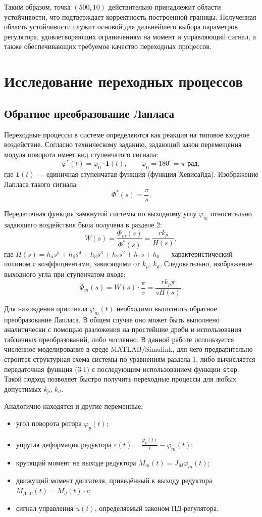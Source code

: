 \documentclass[a4paper, 14pt]{extarticle}
\begin{document}
    Таким образом, точка $(500,10)$ действительно принадлежит области устойчивости, что подтверждает корректность построенной границы. Полученная область устойчивости служит основой для дальнейшего выбора параметров регулятора, удовлетворяющих ограничениям на момент и управляющий сигнал, а также обеспечивающих требуемое качество переходных процессов.

    \newpage
    \section{Исследование переходных процессов}

    \subsection{Обратное преобразование Лапласа}
    Переходные процессы в системе определяются как реакция на типовое входное воздействие. Согласно техническому заданию, задающий закон перемещения модуля поворота имеет вид ступенчатого сигнала:
    \[
    \varphi^*(t) = \varphi_0 \cdot \mathbf{1}(t), \qquad \varphi_0 = 180^\circ = \pi \text{ рад},
    \]
    где $\mathbf{1}(t)$ — единичная ступенчатая функция (функция Хевисайда). Изображение Лапласа такого сигнала:
    \[
    \Phi^*(s) = \frac{\pi}{s}.
    \]

    Передаточная функция замкнутой системы по выходному углу $\varphi_m$ относительно задающего воздействия была получена в разделе 2:
    \[
    W(s) = \frac{\Phi_m(s)}{\Phi^*(s)} = \frac{r k_p}{H(s)},
    \]
    где $H(s) = h_5 s^5 + h_4 s^4 + h_3 s^3 + h_2 s^2 + h_1 s + h_0$ — характеристический полином с коэффициентами, зависящими от $k_p$, $k_d$. Следовательно, изображение выходного угла при ступенчатом входе:
    \[
    \Phi_m(s) = W(s) \cdot \frac{\pi}{s} = \frac{r k_p \pi}{s H(s)}. \tag{3.1}
    \]

    Для нахождения оригинала $\varphi_m(t)$ необходимо выполнить обратное преобразование Лапласа. В общем случае оно может быть выполнено аналитически с помощью разложения на простейшие дроби и использования табличных преобразований, либо численно. В данной работе используется численное моделирование в среде MATLAB/Simulink, для чего предварительно строится структурная схема системы по уравнениям раздела 1, либо вычисляется передаточная функция (3.1) с последующим использованием функции \texttt{step}. Такой подход позволяет быстро получить переходные процессы для любых допустимых $k_p$, $k_d$.

    Аналогично находятся и другие переменные: 
    \begin{itemize}
    \item угол поворота ротора $\varphi_p(t)$;
    \item упругая деформация редуктора $\varepsilon(t) = \frac{\varphi_p(t)}{i} - \varphi_m(t)$;
    \item крутящий момент на выходе редуктора $M_m(t) = J_M \ddot{\varphi}_m(t)$;
    \item движущий момент двигателя, приведённый к выходу редуктора $M_{\text{ДПР}}(t) = M_d(t) \cdot i$;
    \item сигнал управления $u(t)$, определяемый законом ПД-регулятора.
    \end{itemize}
\end{document}
